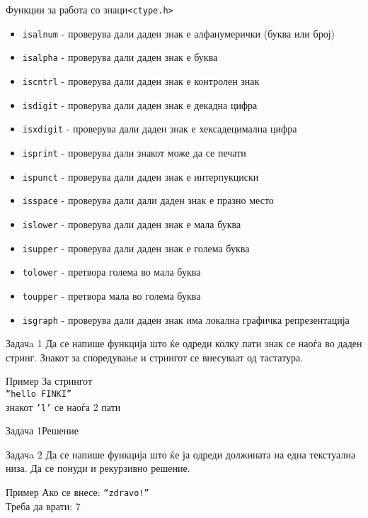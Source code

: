 \begin{frame}[shrink=10]{Функции за работа со знаци}{\texttt{<ctype.h>}}
\begin{itemize}
  \item \texttt{isalnum} - проверува дали даден знак е алфанумерички (буква или
  број)
  \item \texttt{isalpha} - проверува дали даден знак е буква
  \item \texttt{iscntrl} - проверува дали даден знак е контролен знак
  \item \texttt{isdigit} - проверува дали даден знак е декадна цифра
  \item \texttt{isxdigit} - проверува дали даден знак е хексадецимална цифра
  \item \texttt{isprint} - проверува дали знакот може да се печати
  \item \texttt{ispunct} - проверува дали даден знак е интерпукциски
  \item \texttt{isspace} - проверува дали дали даден знак е празно место
  \item \texttt{islower} - проверува дали даден знак е мала буква
  \item \texttt{isupper} - проверува дали даден знак е голема буква
  \item \texttt{tolower} - претвора голема во мала буква
  \item \texttt{toupper}  - претвора мала во голема буква
  \item \texttt{isgraph} - проверува дали даден знак има локална графичка
  репрезентација
\end{itemize}
\end{frame}




\begin{frame}{Задачa 1}
Да се напише функција што ќе одреди колку пати знак се наоѓа во даден стринг.
Знакот за споредување и стрингот се внесуваат од тастатура.
\begin{exampleblock}{Пример}
За стрингот\\
\texttt{``hello FINKI''}\\
знакот \texttt{'l'} се наоѓа 2 пати
\end{exampleblock}
\end{frame}

\begin{frame}[fragile]{Задача 1}{Решение}

\end{frame}

\begin{frame}{Задачa 2}
Да се напише функција што ќе ја одреди должината на една текстуална низа. Да се
понуди и рекурзивно решение.
\begin{exampleblock}{Пример} 
Ако се внесе: \texttt{``zdravo!''}\\
Треба да врати: 7
\end{exampleblock}
\end{frame}

